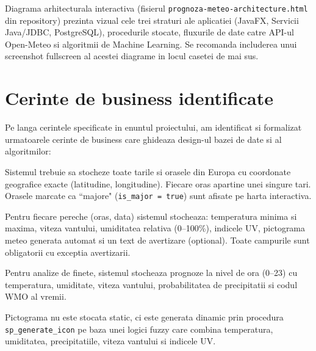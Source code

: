 \documentclass[12pt,a4paper]{article}
\begin{document}
Diagrama arhitecturala interactiva (fisierul \texttt{prognoza-meteo-architecture.html} din repository) prezinta vizual cele trei straturi ale aplicatiei (JavaFX, Servicii Java/JDBC, PostgreSQL), procedurile stocate, fluxurile de date catre API-ul Open-Meteo si algoritmii de Machine Learning. Se recomanda includerea unui screenshot fullscreen al acestei diagrame in locul casetei de mai sus.

\section{Cerinte de business identificate}

Pe langa cerintele specificate in enuntul proiectului, am identificat si formalizat urmatoarele cerinte de business care ghideaza design-ul bazei de date si al algoritmilor:

\begin{infobox}
Sistemul trebuie sa stocheze toate tarile si orasele din Europa cu coordonate geografice exacte (latitudine, longitudine). Fiecare oras apartine unei singure tari. Orasele marcate ca ``majore" (\texttt{is\_major = true}) sunt afisate pe harta interactiva.
\end{infobox}

\begin{infobox}
Pentru fiecare pereche (oras, data) sistemul stocheaza: temperatura minima si maxima, viteza vantului, umiditatea relativa (0--100\%), indicele UV, pictograma meteo generata automat si un text de avertizare (optional). Toate campurile sunt obligatorii cu exceptia avertizarii.
\end{infobox}

\begin{infobox}
Pentru analize de finete, sistemul stocheaza prognoze la nivel de ora (0--23) cu temperatura, umiditate, viteza vantului, probabilitatea de precipitatii si codul WMO al vremii.
\end{infobox}

\begin{infobox}
Pictograma nu este stocata static, ci este generata dinamic prin procedura \texttt{sp\_generate\_icon} pe baza unei logici fuzzy care combina temperatura, umiditatea, precipitatiile, viteza vantului si indicele UV.
\end{infobox}
\end{document}
